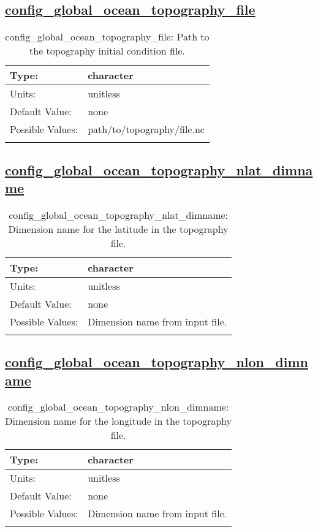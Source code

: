 \subsection[config\_global\_ocean\_topography\_file]{\hyperref[sec:nm_tab_global_ocean]{config\_global\_ocean\_topography\_file}}
\label{subsec:nm_sec_config_global_ocean_topography_file}
\begin{center}
\begin{longtable}{| p{2.0in} || p{4.0in} |}
    \hline
    Type: & character \\
    \hline
    Units: & \si{unitless} \\
    \hline
    Default Value: & none \\
    \hline
    Possible Values: & path/to/topography/file.nc \\
    \hline
    \caption{config\_global\_ocean\_topography\_file: Path to the topography initial condition file.}
\end{longtable}
\end{center}
\subsection[config\_global\_ocean\_topography\_nlat\_dimname]{\hyperref[sec:nm_tab_global_ocean]{config\_global\_ocean\_topography\_nlat\_dimname}}
\label{subsec:nm_sec_config_global_ocean_topography_nlat_dimname}
\begin{center}
\begin{longtable}{| p{2.0in} || p{4.0in} |}
    \hline
    Type: & character \\
    \hline
    Units: & \si{unitless} \\
    \hline
    Default Value: & none \\
    \hline
    Possible Values: & Dimension name from input file. \\
    \hline
    \caption{config\_global\_ocean\_topography\_nlat\_dimname: Dimension name for the latitude in the topography file.}
\end{longtable}
\end{center}
\subsection[config\_global\_ocean\_topography\_nlon\_dimname]{\hyperref[sec:nm_tab_global_ocean]{config\_global\_ocean\_topography\_nlon\_dimname}}
\label{subsec:nm_sec_config_global_ocean_topography_nlon_dimname}
\begin{center}
\begin{longtable}{| p{2.0in} || p{4.0in} |}
    \hline
    Type: & character \\
    \hline
    Units: & \si{unitless} \\
    \hline
    Default Value: & none \\
    \hline
    Possible Values: & Dimension name from input file. \\
    \hline
    \caption{config\_global\_ocean\_topography\_nlon\_dimname: Dimension name for the longitude in the topography file.}
\end{longtable}
\end{center}
